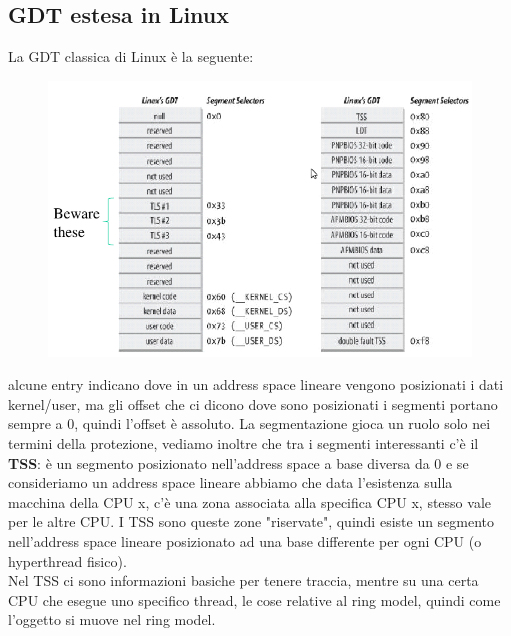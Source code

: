 \documentclass[12pt, oneside]{extbook}
\begin{document}
\subsection{GDT estesa in Linux}
La GDT classica di Linux è la seguente:
\begin{figure}[!h]
	\includegraphics[scale=0.3]{immagini/linux_gdt.png}
\end{figure}
alcune entry indicano dove in un address space lineare vengono posizionati i dati kernel/user, ma gli offset che ci dicono dove sono posizionati i segmenti portano sempre a 0, quindi l'offset è assoluto. La segmentazione gioca un ruolo solo nei termini della protezione, vediamo inoltre che tra i segmenti interessanti c'è il \textbf{TSS}: è un segmento posizionato nell'address space a base diversa da 0 e se consideriamo un address space lineare abbiamo che data l'esistenza sulla macchina della CPU x, c'è una zona associata alla specifica CPU x, stesso vale per le altre CPU. I TSS sono queste zone "riservate", quindi esiste un segmento nell'address space lineare posizionato ad una base differente per ogni CPU (o hyperthread fisico).\\ Nel TSS ci sono informazioni basiche per tenere traccia, mentre su una certa CPU che esegue uno specifico thread, le cose relative al ring model, quindi come l'oggetto si muove nel ring model.
\end{document}
